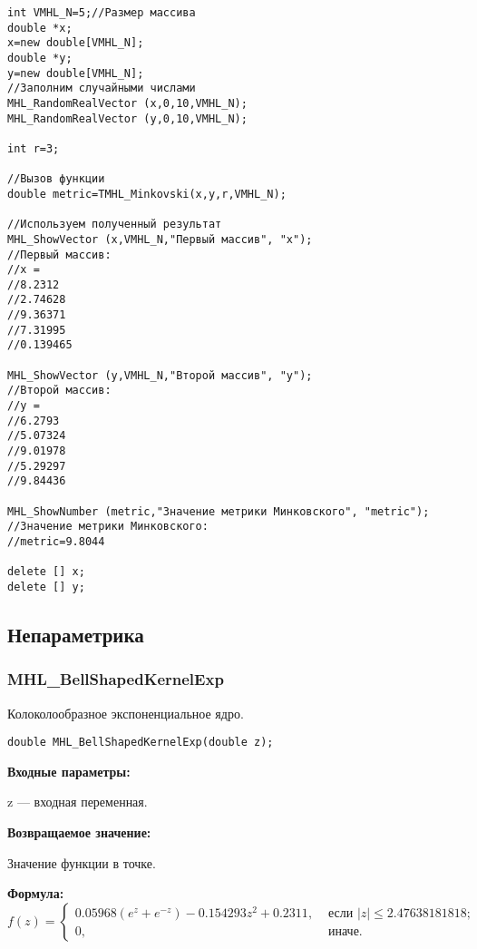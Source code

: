 \documentclass[a4paper,12pt]{article}
\begin{document}
\begin{lstlisting}[label=code_use_TMHL_Minkovski,caption=Пример использования]
int VMHL_N=5;//Размер массива
double *x;
x=new double[VMHL_N];
double *y;
y=new double[VMHL_N];
//Заполним случайными числами
MHL_RandomRealVector (x,0,10,VMHL_N);
MHL_RandomRealVector (y,0,10,VMHL_N);

int r=3;

//Вызов функции
double metric=TMHL_Minkovski(x,y,r,VMHL_N);

//Используем полученный результат
MHL_ShowVector (x,VMHL_N,"Первый массив", "x");
//Первый массив:
//x =	
//8.2312
//2.74628
//9.36371
//7.31995
//0.139465

MHL_ShowVector (y,VMHL_N,"Второй массив", "y");
//Второй массив:
//y =	
//6.2793
//5.07324
//9.01978
//5.29297
//9.84436

MHL_ShowNumber (metric,"Значение метрики Минковского", "metric");
//Значение метрики Минковского:
//metric=9.8044

delete [] x;
delete [] y;
\end{lstlisting}

\subsection{Непараметрика}

\subsubsection{MHL\_BellShapedKernelExp}\label{MHL_BellShapedKernelExp}

Колоколообразное экспоненциальное ядро.


\begin{lstlisting}[label=code_syntax_MHL_BellShapedKernelExp,caption=Синтаксис]
double MHL_BellShapedKernelExp(double z);
\end{lstlisting}

\textbf{Входные параметры:}
 
z --- входная переменная.

\textbf{Возвращаемое значение:}
 
Значение функции в точке.

\textbf{Формула:}
\begin{equation*}
f\left(z \right)=\left\lbrace \begin{aligned} 0.05968\left( e^z+e^{-z}\right) -0.154293 z^2+0.2311,& \text{ если } \left| z\right|\leq 2.47638181818 ; \\ 0,& \text{ иначе}. \end{aligned}\right.
\end{equation*}
\end{document}
